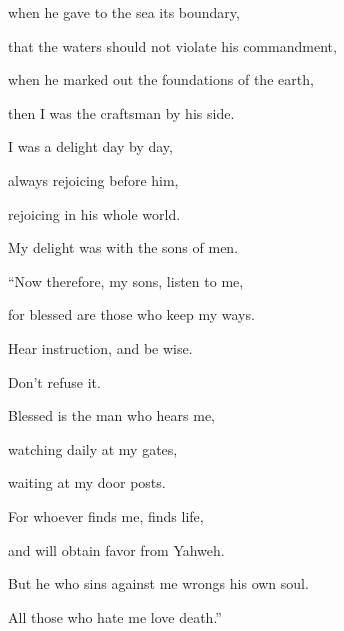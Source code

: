 {\par }{\Q {}when he gave to the sea its boundary,
\par }{\QB that the waters should not violate his commandment,
\par }{\QB when he marked out the foundations of the earth,
\par }{\Q {}then I was the craftsman by his side.
\par }{\QB I was a delight day by day,
\par }{\QB always rejoicing before him,
\par }{\Q {}rejoicing in his whole world.
\par }{\QB My delight was with the sons of men.
\par }{\BB \par }{\Q {}“Now therefore, my sons, listen to me,
\par }{\QB for blessed are those who keep my ways.
\par }{\Q {}Hear instruction, and be wise.
\par }{\QB Don’t refuse it.
\par }{\Q {}Blessed is the man who hears me,
\par }{\QB watching daily at my gates,
\par }{\QB waiting at my door posts.
\par }{\Q {}For whoever finds me, finds life,
\par }{\QB and will obtain favor from Yahweh.
\par }{\Q {}But he who sins against me wrongs his own soul.
\par }{\QB All those who hate me love death.”

}
